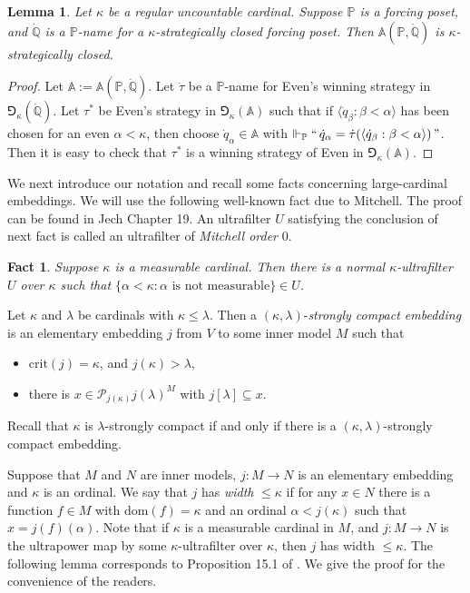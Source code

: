 \documentclass[a4paper,12pt,reqno,oneside]{amsart}
\theoremstyle{plain}
\newtheorem{lemma}[theorem]{Lemma}
\newtheorem{fact}[theorem]{Fact}
\newcommand{\mrm}{\mathrm}
\newcommand{\mbb}{\mathbb}
\newcommand{\mcal}{\mathcal}
\newcommand{\dom}{\mathrm{dom}}
\begin{document}
\begin{lemma} \label{lem:term_basic2}
Let $\kappa$ be a regular uncountable cardinal. Suppose $\mbb{P}$ is a forcing poset, and $\dot{\mbb{Q}}$ is a $\mbb{P}$-name for a $\kappa$-strategically closed forcing poset. Then $\mbb{A} ( \mbb{P} , \dot{\mbb{Q}} )$ is $\kappa$-strategically closed.
\end{lemma}

\begin{proof}
Let $\mbb{A} := \mbb{A} ( \mbb{P} , \dot{\mbb{Q}} )$. Let $\dot{\tau}$ be a $\mbb{P}$-name for Even's winning strategy in $\Game_\kappa ( \dot{\mbb{Q}} )$. Let $\tau^*$ be Even's strategy in $\Game_\kappa ( \mbb{A} )$ such that if $\langle \dot{q}_\beta : \beta < \alpha \rangle$ has been chosen for an even $\alpha < \kappa$, then choose $\dot{q}_\alpha \in \mbb{A}$ with $\Vdash_\mbb{P} ``\,\dot{q}_\alpha = \dot{\tau} ( \langle \dot{q}_\beta : \beta < \alpha \rangle ) \,"$. Then it is easy to check that $\tau^*$ is a winning strategy of Even in $\Game_\kappa ( \mbb{A} )$.
\end{proof}

We next introduce our notation and recall some facts concerning large-cardinal embeddings. We will use the following well-known fact due to Mitchell. The proof can be found in Jech \cite{Je} Chapter 19. An ultrafilter $U$ satisfying the conclusion of next fact is called an ultrafilter of \emph{Mitchell order} $0$.

\begin{fact} \label{fact:Mitchell_order_0}
Suppose $\kappa$ is a measurable cardinal. Then there is a normal $\kappa$-ultrafilter $U$ over $\kappa$ such that $\{ \alpha < \kappa : \mbox{$\alpha$ is not measurable} \} \in U$.
\end{fact}

Let $\kappa$ and $\lambda$ be cardinals with $\kappa \leq \lambda$. Then a $( \kappa , \lambda )$-\emph{strongly compact embedding} is an elementary embedding $j$ from $V$ to some inner model $M$ such that
\begin{itemize}
\item[(i)] $\mrm{crit} (j) = \kappa$, and $j( \kappa ) > \lambda$,
\item[(ii)] there is $x \in \mcal{P}_{j( \kappa )} j( \lambda )^M$ with $j[ \lambda ] \subseteq x$.
\end{itemize}
Recall that $\kappa$ is $\lambda$-strongly compact if and only if there is a $( \kappa , \lambda )$-strongly compact embedding.

Suppose that $M$ and $N$ are inner models, $j : M \to N$ is an elementary embedding and $\kappa$ is an ordinal. We say that $j$ has \emph{width} $\leq \kappa$ if for any $x \in N$ there is a function $f \in M$ with $\dom (f) = \kappa$ and an ordinal $\alpha < j( \kappa )$ such that $x = j(f)( \alpha )$. Note that if $\kappa$ is a measurable cardinal in $M$, and $j : M \to N$ is the ultrapower map by some $\kappa$-ultrafilter over $\kappa$, then $j$ has width $\leq \kappa$. The following lemma corresponds to Proposition 15.1 of \cite{C}. We give the proof for the convenience of the readers.
\end{document}
